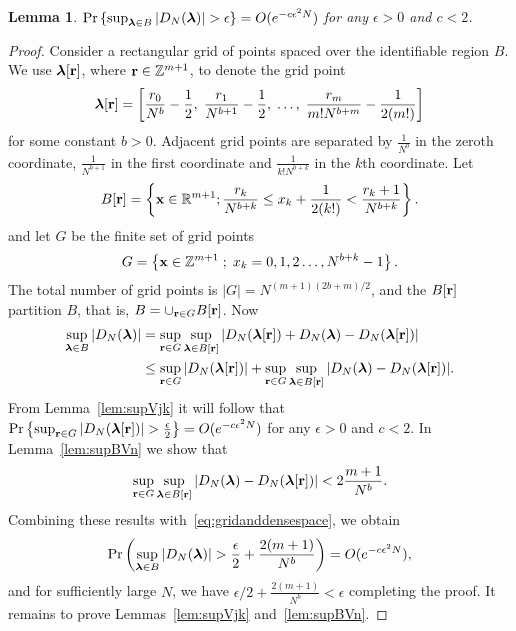 \documentclass[aap,preprint]{imsart}
\newcommand{\reals}{{\mathbb R}}
\newcommand{\ints}{{\mathbb Z}}
\newcommand{\prob}{\operatorname{Pr}}
\renewcommand{\mid}{\; ; \;}
\newcommand{\abs}[1]{\left\vert #1 \right\vert}
\newcommand{\sabs}[1]{\vert #1 \vert}
\newtheorem{lemma}{Lemma}
\begin{document}
\begin{lemma} \label{lem:vn} $\prob \left\{ \sup_{\lambdabf \in B}\abs{ D_N(\lambdabf) } > \epsilon \right\} = O(e^{-c \epsilon^2 N})$ for any $\epsilon > 0$ and $c < 2$.
 \end{lemma}
\begin{proof}
Consider a rectangular grid of points spaced over the identifiable region $B$.  We use $\boldsymbol{\lambda}[\mathbf{r}]$, where $\rbf \in \ints^{m+1}$, to denote the grid point 
\[ 
 \boldsymbol{\lambda}[\mathbf{r}] = \left[  \frac{r_0}{N^{b}} - \frac{1}{2}, \; \frac{r_1}{N^{b+1}} - \frac{1}{2}, \; \dots, \; \frac{r_m}{m!N^{b+m}} - \frac{1}{2(m!) }\right]
\]
 for some constant $b>0$.  Adjacent grid points are separated by $\tfrac{1}{N^b}$ in the zeroth coordinate, $\tfrac{1}{N^{b+1}}$ in the first coordinate and $\tfrac{1}{k!N^{b+k}}$ in the $k$th coordinate. Let
 \[
 B[\rbf]=\left\{  \xbf\in\reals^{m+1}  ; \frac{r_k}{N^{b+k}}\leq x_k + \frac{1}{2(k!)} < \frac{r_k + 1}{N^{b+k}} \right\}  .
 \]
and let $G$ be the finite set of grid points
\[
G = \left\{ \xbf \in \ints^{m+1} \mid x_k = 0,1,2\dots,N^{b+k}-1  \right\}.
\]
The total number of grid points is $|G| = N^{(m+1)(2b + m)/2}$, and the $B[\mathbf{r}]$ partition $B$, that is, $B = \cup_{\mathbf{r} \in G}B[\mathbf{r}]$.  Now 
\begin{align}
 \sup_{\lambdabf \in B}\sabs{ D_N(\lambdabf) }  &= \sup_{\rbf \in G}\sup_{ \lambdabf \in B[\rbf]}\sabs{ D_N(\lambdabf[\rbf]) + D_N(\lambdabf) - D_N(\lambdabf[\rbf])  } \nonumber \\
 &\leq \sup_{\rbf \in G}\sabs{ D_N(\lambdabf[\rbf])} + \sup_{\rbf \in G}\sup_{\lambdabf\in B[\rbf]}\sabs{ D_N(\lambdabf) - D_N(\lambdabf[\rbf])  }. \label{eq:gridanddensespace}
 \end{align}
From Lemma~\ref{lem:supVjk} it will follow that $\prob\left\{   \sup_{\rbf \in G }\abs{ D_N(\lambdabf[\rbf])  } > \frac{\epsilon}{2} \right\} = O(e^{-c \epsilon^2 N})$
for any $\epsilon > 0$ and $c < 2$.  In Lemma~\ref{lem:supBVn} we show that
\[
\sup_{\rbf \in G}\sup_{\lambdabf\in B[\rbf]}\abs{ D_N(\lambdabf) - D_N(\lambdabf[\rbf])} < 2\frac{m+1}{N^b}.
\]
Combining these results with~\eqref{eq:gridanddensespace}, we obtain
\[
\prob\left(\sup_{\lambdabf \in B }\sabs{ D_N(\lambdabf)} > \frac{\epsilon}{2} +  \frac{2(m+1)}{N^b} \right) = O(e^{-c \epsilon^2 N}),
\]
and for sufficiently large $N$, we have $\epsilon/2 + \frac{2(m+1)}{N^b} < \epsilon$ completing the proof.  It remains to prove Lemmas~\ref{lem:supVjk} and~\ref{lem:supBVn}.
\end{proof}
\end{document}
